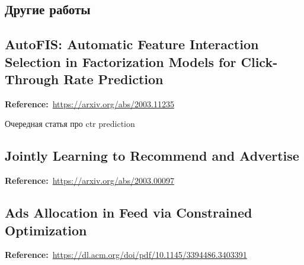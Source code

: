 \begin{bibunit}[plainnat]










% 


\chapter{Другие работы}

\section*{AutoFIS: Automatic Feature Interaction Selection in Factorization Models for Click-Through Rate Prediction}

\textbf{Reference:}~\url{https://arxiv.org/abs/2003.11235}

Очередная статья про ctr prediction

\section*{Jointly Learning to Recommend and Advertise}

\textbf{Reference:}~\url{https://arxiv.org/abs/2003.00097}

\section*{Ads Allocation in Feed via Constrained Optimization}

\textbf{Reference:}~\url{https://dl.acm.org/doi/pdf/10.1145/3394486.3403391}

\end{bibunit}
